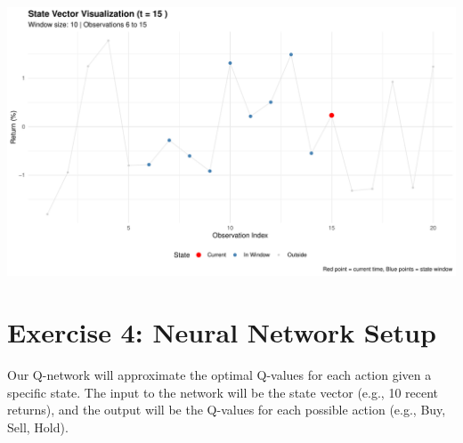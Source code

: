 \documentclass[
]{article}
\begin{document}
\includegraphics{task1_files/figure-latex/state-visualization-1.pdf}

\hypertarget{exercise-4-neural-network-setup}{%
\section{Exercise 4: Neural Network
Setup}\label{exercise-4-neural-network-setup}}

Our Q-network will approximate the optimal Q-values for each action
given a specific state. The input to the network will be the state
vector (e.g., 10 recent returns), and the output will be the Q-values
for each possible action (e.g., Buy, Sell, Hold).
\end{document}
